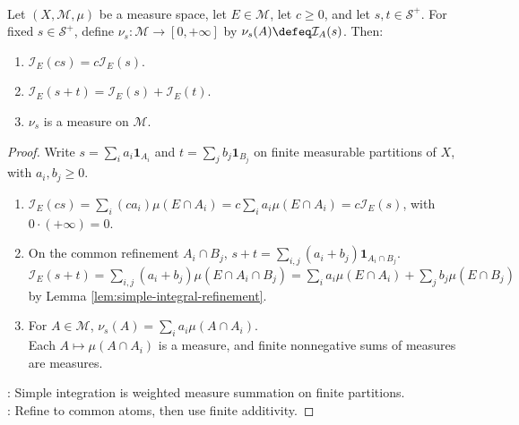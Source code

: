\begin{proposition} \label{prop:simple-integral-linearity-and-measure} \\
Let $(X,\mathcal{M},\mu)$ be a measure space, let $E\in\mathcal{M}$, let $c\geq0$, and let $s,t\in\mathcal{S}^+$. For fixed $s\in\mathcal{S}^+$, define $\nu_s:\mathcal{M}\to[0,+\infty]$ by $\nu_s(A)\defeq\mathcal{I}_A(s)$. Then:
\begin{enumerate}[label=(\roman*)]
\setlength{\itemsep}{0pt}
\item $\mathcal{I}_E(cs)=c\mathcal{I}_E(s)$.
\item $\mathcal{I}_E(s+t)=\mathcal{I}_E(s)+\mathcal{I}_E(t)$.
\item $\nu_s$ is a measure on $\mathcal{M}$.
\end{enumerate}
\begin{proof} Write $s=\sum\limits_ia_i\mathbf{1}_{A_i}$ and $t=\sum\limits_jb_j\mathbf{1}_{B_j}$ on finite measurable partitions of $X$, with $a_i,b_j\geq0$.
\begin{enumerate}[label=(\roman*)]
\setlength{\itemsep}{0pt}
\item $\mathcal{I}_E(cs)=\sum\limits_i(ca_i)\mu(E\cap A_i)=c\sum\limits_ia_i\mu(E\cap A_i)=c\mathcal{I}_E(s)$, with $0\cdot(+\infty)=0$.
\item On the common refinement $A_i\cap B_j$, $s+t=\sum\limits_{i,j}(a_i+b_j)\mathbf{1}_{A_i\cap B_j}$.\\
$\mathcal{I}_E(s+t)=\sum\limits_{i,j}(a_i+b_j)\mu(E\cap A_i\cap B_j)=\sum\limits_ia_i\mu(E\cap A_i)+\sum\limits_jb_j\mu(E\cap B_j)$ by Lemma \ref{lem:simple-integral-refinement}.
\item For $A\in\mathcal{M}$, $\nu_s(A)=\sum\limits_ia_i\mu(A\cap A_i)$.\\
Each $A\mapsto\mu(A\cap A_i)$ is a measure, and finite nonnegative sums of measures are measures.
\end{enumerate}
: Simple integration is weighted measure summation on finite partitions.\\
: Refine to common atoms, then use finite additivity.
\end{proof}
\end{proposition}

